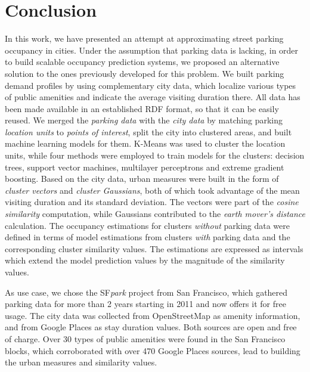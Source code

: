 \section{Conclusion}
In this work, we have presented an attempt at approximating street parking occupancy in cities.
Under the assumption that parking data is lacking, in order to build scalable occupancy prediction systems, we proposed an alternative solution to the ones previously developed for this problem.
We built parking demand profiles by using complementary city data, which localize various types of public amenities and indicate the average visiting duration there.
All data has been made available in an established RDF format, so that it can be easily reused.
We merged the \textit{parking data} with the \textit{city data} by matching parking \textit{location units} to \textit{points of interest}, split the city into clustered areas, and built machine learning models for them.
K-Means was used to cluster the location units, while four methods were employed to train models for the clusters: decision trees, support vector machines, multilayer perceptrons and extreme gradient boosting.
Based on the city data, urban measures were built in the form of \textit{cluster vectors} and \textit{cluster Gaussians}, both of which took advantage of the mean visiting duration and its standard deviation.
The vectors were part of the \textit{cosine similarity} computation, while Gaussians contributed to the \textit{earth mover's distance} calculation.
The occupancy estimations for clusters \textit{without} parking data were defined in terms of model estimations from clusters \textit{with} parking data and the corresponding cluster similarity values.
The estimations are expressed as intervals which extend the model prediction values by the magnitude of the similarity values. 

As use case, we chose the SF\textit{park} project from San Francisco, which gathered parking data for more than 2 years starting in 2011 and now offers it for free usage.
The city data was collected from OpenStreetMap as amenity information, and from Google Places as stay duration values.
Both sources are open and free of charge.
Over 30 types of public amenities were found in the San Francisco blocks, which corroborated with over 470 Google Places sources, lead to building the urban measures and similarity values. 

